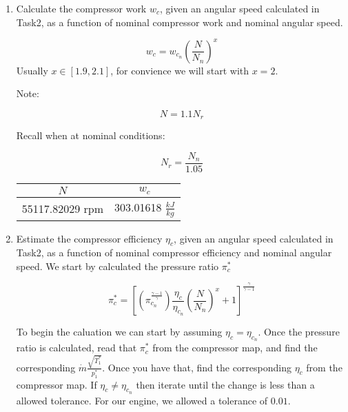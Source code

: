 \documentclass[12pt,english]{article}
\begin{document}
\begin{enumerate}
  \item Calculate the compressor work $w_{c}$, given an angular speed calculated
  in Task2, as a function of nominal compressor work and nominal angular speed.

  \begin{equation}
    w_{c} = w_{c_{n}} \left( \frac{N}{N_{n}} \right)^{x}
  \end{equation}
  Usually $x \in [1.9, 2.1]$, for convience we will start with $x = 2$.

  Note: 

  \begin{equation}
    N = 1.1N_{r}
  \end{equation}

  Recall when at nominal conditions:

  \begin{equation}
    N_{r} = \frac{N_{n}}{1.05}
  \end{equation}

  \begin{center}
    \begin{tabular}{|c|c|}
      \hline
      $N$ & $w_{c}$ \\
      \hline
      55117.82029 rpm & 303.01618 $\frac{kJ}{kg}$ \\
      \hline
    \end{tabular}
  \end{center}

  \item Estimate the compressor efficiency $\eta_{c}$, given an angular 
  speed calculated in Task2, as a function of nominal compressor efficiency and
  nominal angular speed. We start by calculated the pressure ratio $\pi_{c}^{*}$

  \begin{equation}
    \pi_{c}^{*} = \left[ \left(\pi_{c_{n}}^{\frac{\gamma-1}{\gamma}}\right)
    \frac{\eta_{c}}{\eta_{c_{n}}} \left(\frac{N}{N_{n}}\right)^{x} +1 \right]^{\frac{\gamma}{\gamma-1}}
  \end{equation}

  To begin the caluation we can start by assuming $\eta_{c} = \eta_{c_{n}}$. Once
  the pressure ratio is calculated, read that $\pi_{c}^{*}$ from the compressor map, 
  and find the corresponding $\dot{m}\frac{\sqrt{T_{1}^{*}}}{p_{1}^{*}}$. Once you have 
  that, find the corresponding $\eta_{c}$ from the compressor map. If $\eta_{c} \neq \eta_{c_{n}}$ 
  then iterate until the change is less than a allowed tolerance. For our engine,
  we allowed a tolerance of $0.01$.


\end{enumerate}
\end{document}
